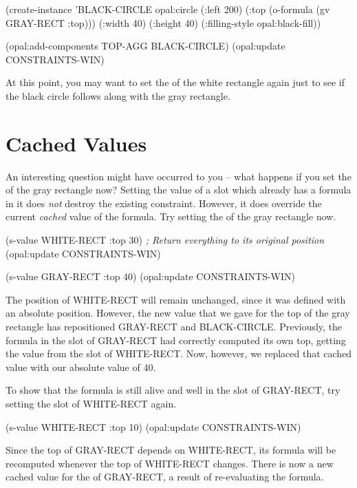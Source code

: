 \begin{programexample}
(create-instance 'BLACK-CIRCLE opal:circle
   (:left 200)
   (:top (o-formula (gv GRAY-RECT :top)))
   (:width 40) (:height 40)
   (:filling-style opal:black-fill))

(opal:add-components TOP-AGG BLACK-CIRCLE)
(opal:update CONSTRAINTS-WIN)
\end{programexample}

At this point, you may want to set the  of the white
rectangle again just to see if the black circle follows along with
the gray rectangle.


\section{Cached Values}

An interesting question might have occurred to
you -- what happens if you set the  of the gray rectangle now?
Setting the value of a slot which already has a formula in it does {\it not}
destroy the existing constraint.  However, it does override the
current {\it cached} value of the formula.  Try setting the  of
the gray rectangle now.

\begin{programexample}
(s-value WHITE-RECT :top 30)  {\it ; Return everything to its original position}
(opal:update CONSTRAINTS-WIN)

(s-value GRAY-RECT :top 40)
(opal:update CONSTRAINTS-WIN)
\end{programexample}

The position of WHITE-RECT will remain unchanged, since it was defined with
an absolute position.  However, the new value that we gave for the top
of the gray rectangle has repositioned GRAY-RECT and BLACK-CIRCLE.
Previously, the formula in the  slot of GRAY-RECT had
correctly computed its own top, getting the value from the 
slot of WHITE-RECT.  Now, however, we replaced that cached value
with our absolute value of 40.

To show that the formula is still alive and well in the  slot
of GRAY-RECT, try setting the  slot of WHITE-RECT again.

\begin{programexample}
(s-value WHITE-RECT :top 10)
(opal:update CONSTRAINTS-WIN)
\end{programexample}

Since the top of GRAY-RECT depends on WHITE-RECT, its formula will be
recomputed whenever the top of WHITE-RECT changes.  There is now a new
cached value for the  of GRAY-RECT, a result of re-evaluating
the formula.


